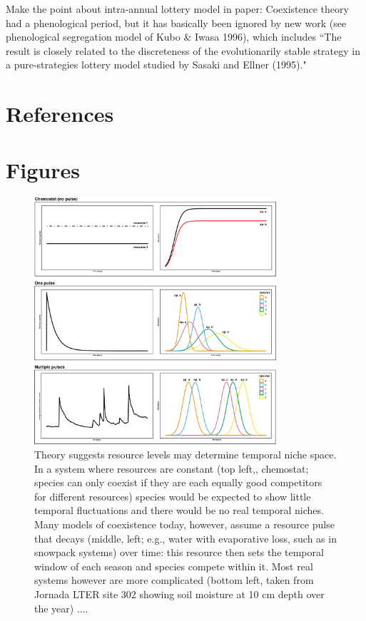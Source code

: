 \documentclass[11pt]{article}
\begin{document}
Make the point about intra-annual lottery model in paper: Coexistence theory had a phenological period, but it has basically been ignored by new work (see phenological segregation model of Kubo \& Iwasa 1996), which includes ``The result is closely related to the discreteness of the evolutionarily stable strategy in a pure-strategies lottery model studied by Sasaki and Ellner (1995)." 

\newpage
\section{References}


\newpage
\section{Figures}
\begin{figure}[h!]
\centering
\includegraphics[width=0.8\textwidth]{..//figures/JN_conceptfigs/sixpanel_concept.png}
\caption{Theory suggests resource levels may determine temporal niche space. In a system where resources are constant (top left,, chemostat; species can only coexist if they are each equally good competitors for different resources) species would be expected to show little temporal fluctuations and there would be no real temporal niches. Many models of coexistence today, however, assume a resource pulse that decays (middle, left; e.g., water with evaporative loss, such as in snowpack systems) over time: this resource then sets the temporal window of each season and species compete within it. Most real systems however are more complicated (bottom left, taken from Jornada LTER site 302 showing soil moisture at 10 cm depth over the year) ....} 
 \label{fig:resource}
\end{figure}
\end{document}
